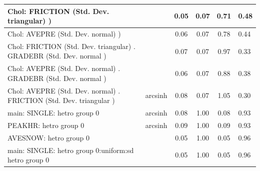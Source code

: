\begin{table}
\begin{center}
\begin{tabular}{|l|l|c|c|c|l|}
			\hline
			 Chol: FRICTION (Std. Dev. triangular) ) &  & 0.05 & 0.07 & 0.71 & 0.48 \\
			\hline
			 Chol: AVEPRE (Std. Dev. normal) ) &  & 0.06 & 0.07 & 0.78 & 0.44 \\
			\hline
			 Chol: FRICTION (Std. Dev. triangular) . GRADEBR (Std. Dev.   normal ) &  & 0.07 & 0.07 & 0.97 & 0.33 \\
			\hline
			 Chol: AVEPRE (Std. Dev. normal) . GRADEBR (Std. Dev.   normal ) &  & 0.06 & 0.07 & 0.88 & 0.38 \\
			\hline
			 Chol: AVEPRE (Std. Dev. normal) . FRICTION (Std. Dev.   triangular ) & arcsinh & 0.08 & 0.07 & 1.05 & 0.30 \\
			\hline
			main: SINGLE: hetro group 0 & arcsinh & 0.08 & 1.00 & 0.08 & 0.93 \\
			\hline
			PEAKHR: hetro group 0 & arcsinh & 0.09 & 1.00 & 0.09 & 0.93 \\
			\hline
			AVESNOW: hetro group 0 &  & 0.05 & 1.00 & 0.05 & 0.96 \\
			\hline
			main: SINGLE: hetro group 0:uniform:sd  hetro group 0 &  & 0.05 & 1.00 & 0.05 & 0.96 \\
			\hline
		\end{tabular}
	\end{center}
\end{table}